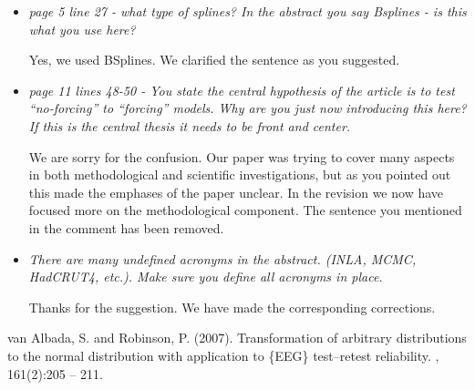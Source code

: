 \documentclass[11pt]{article}
\newcommand{\bl}[1]{\color{red}\textbf{[Bo: #1]}\normalcolor}
\begin{document}
\begin{itemize}
\item \textit{page 5 line 27 - what type of splines? In the abstract you say Bsplines - is this what you use here?}

Yes, we used BSplines. We clarified the sentence as you suggested.

\item \textit{page 11 lines 48-50 - You state the central hypothesis of the
    article is to test “no-forcing” to “forcing” models. Why are you just now
    introducing this here? If this is the central thesis it needs to be front
    and center.}

We are sorry for the confusion. Our paper was trying to cover many aspects in both methodological and scientific investigations, but as you pointed out this made the emphases of the paper unclear. In the revision we now have focused more on the methodological component. The sentence you mentioned in the comment has been removed.  


\item \textit{There are many undefined acronyms in the abstract. (INLA, MCMC,
    HadCRUT4, etc.). Make sure you define all acronyms in place.}

Thanks for the suggestion. We have made the corresponding corrections.


\end{itemize}

\begin{thebibliography}{}

van Albada, S. and Robinson, P. (2007).
\newblock Transformation of arbitrary distributions to the normal distribution
  with application to \{EEG\} test--retest reliability.
, 161(2):205 -- 211.

\end{thebibliography}
\end{document}
